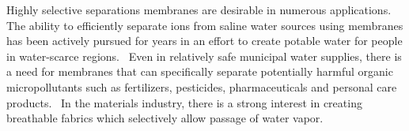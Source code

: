 \documentclass[12pt]{article}
\begin{document}
  
  Highly selective separations membranes are desirable in numerous applications. 
  The ability to efficiently separate ions from saline water sources using membranes 
  has been actively pursued for years in an effort to create potable water for people 
  in water-scarce regions.~\cite{werber_materials_2016} Even in relatively safe
  municipal water supplies, there is a need for membranes that can specifically separate
  potentially harmful organic micropollutants such as fertilizers, pesticides, pharmaceuticals
  and personal care products.~\cite{barbosa_occurrence_2016} In the materials industry,
  there is a strong interest in creating breathable fabrics which selectively allow 
  passage of water vapor.~\cite{mondloch_destruction_2015}
\end{document}
